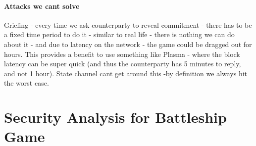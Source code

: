 \documentclass{llncs}
\begin{document}
\paragraph{Attacks we cant solve} Griefing - every time we ask counterparty to reveal commitment - there has to be a fixed time period to do it - similar to real life - there is nothing we can do about it - and due to latency on the network - the game could be dragged out for hours. This provides a benefit to use something like Plasma - where the block latency can be super quick (and thus the counterparty has 5 minutes to reply, and not 1 hour). State channel cant get around this -by definition we always hit the worst case. 


 
\appendix

\section{Security Analysis for Battleship Game}
\end{document}
